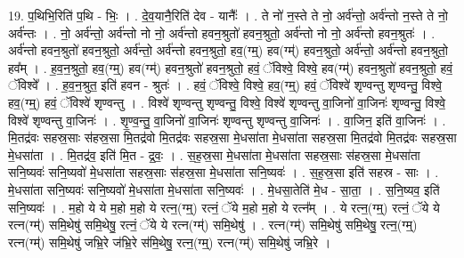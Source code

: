 \documentclass[17pt]{extarticle}
\begin{document}
19. प॒थिभि॒रिति॑ प॒थि - भिः॒ । . दे॒व॒यानै॒रिति॑ देव - यानैः᳚ । . ते नो॑ न॒स्ते ते नो॒ अर्व॑न्तो॒ अर्व॑न्तो न॒स्ते ते नो॒ अर्व॑न्तः । . नो॒ अर्व॑न्तो॒ अर्व॑न्तो नो नो॒ अर्व॑न्तो हवन॒श्रुतो॑ हवन॒श्रुतो॒ अर्व॑न्तो नो नो॒ अर्व॑न्तो हवन॒श्रुतः॑ । . अर्व॑न्तो हवन॒श्रुतो॑ हवन॒श्रुतो॒ अर्व॑न्तो॒ अर्व॑न्तो हवन॒श्रुतो॒ हव॒(ग्म्॒) हव(ग्म्॑) हवन॒श्रुतो॒ अर्व॑न्तो॒ अर्व॑न्तो हवन॒श्रुतो॒ हव᳚म् । . ह॒व॒न॒श्रुतो॒ हव॒(ग्म्॒) हव(ग्म्॑) हवन॒श्रुतो॑ हवन॒श्रुतो॒ हवं॒ ॅविश्वे॒ विश्वे॒ हव(ग्म्॑) हवन॒श्रुतो॑ हवन॒श्रुतो॒ हवं॒ ॅविश्वे᳚ । . ह॒व॒न॒श्रुत॒ इति॑ हवन - श्रुतः॑ । . हवं॒ ॅविश्वे॒ विश्वे॒ हव॒(ग्म्॒) हवं॒ ॅविश्वे॑ शृण्वन्तु शृण्वन्तु॒ विश्वे॒ हव॒(ग्म्॒) हवं॒ ॅविश्वे॑ शृण्वन्तु । . विश्वे॑ शृण्वन्तु शृण्वन्तु॒ विश्वे॒ विश्वे॑ शृण्वन्तु वा॒जिनो॑ वा॒जिनः॑ शृण्वन्तु॒ विश्वे॒ विश्वे॑ शृण्वन्तु वा॒जिनः॑ । . शृ॒ण्व॒न्तु॒ वा॒जिनो॑ वा॒जिनः॑ शृण्वन्तु शृण्वन्तु वा॒जिनः॑ । . वा॒जिन॒ इति॑ वा॒जिनः॑ । . मि॒तद्र॑वः सहस्र॒साः स॑हस्र॒सा मि॒तद्र॑वो मि॒तद्र॑वः सहस्र॒सा मे॒धसा॑ता मे॒धसा॑ता सहस्र॒सा मि॒तद्र॑वो मि॒तद्र॑वः सहस्र॒सा मे॒धसा॑ता । . मि॒तद्र॑व॒ इति॑ मि॒त - द्र॒वः॒ । . स॒ह॒स्र॒सा मे॒धसा॑ता मे॒धसा॑ता सहस्र॒साः स॑हस्र॒सा मे॒धसा॑ता सनि॒ष्यवः॑ सनि॒ष्यवो॑ मे॒धसा॑ता सहस्र॒साः स॑हस्र॒सा मे॒धसा॑ता सनि॒ष्यवः॑ । . स॒ह॒स्र॒सा इति॑ सहस्र - साः । . मे॒धसा॑ता सनि॒ष्यवः॑ सनि॒ष्यवो॑ मे॒धसा॑ता मे॒धसा॑ता सनि॒ष्यवः॑ । . मे॒धसा॒तेति॑ मे॒ध - सा॒ता॒ । . स॒नि॒ष्यव॒ इति॑ सनि॒ष्यवः॑ । . म॒हो ये ये म॒हो म॒हो ये रत्न॒(ग्म्॒) रत्नं॒ ॅये म॒हो म॒हो ये रत्न᳚म् । . ये रत्न॒(ग्म्॒) रत्नं॒ ॅये ये रत्न(ग्म्॑) समि॒थेषु॑ समि॒थेषु॒ रत्नं॒ ॅये ये रत्न(ग्म्॑) समि॒थेषु॑ । . रत्न(ग्म्॑) समि॒थेषु॑ समि॒थेषु॒ रत्न॒(ग्म्॒) रत्न(ग्म्॑) समि॒थेषु॑ जभ्रि॒रे ज॑भ्रि॒रे स॑मि॒थेषु॒ रत्न॒(ग्म्॒) रत्न(ग्म्॑) समि॒थेषु॑ जभ्रि॒रे । \newline
\end{document}
